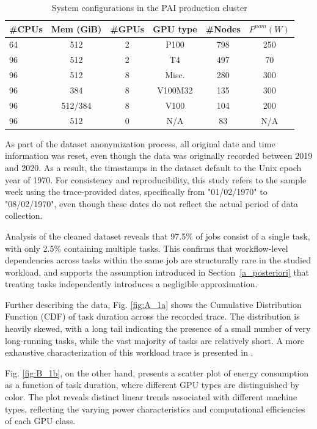 \documentclass[preprint,12pt]{elsarticle}
\begin{document}
\begin{table}[h!]
\centering
\caption{System configurations in the PAI production cluster \cite{Weng2022}}
\label{tab:specs}
\begin{tabular}{lccccc}
\toprule
\textbf{\#CPUs} & \textbf{Mem (GiB)} & \textbf{\#GPUs} & \textbf{GPU type} & \textbf{\#Nodes} & \textbf{$P^{nom} (W)$} \\
\midrule
 64  & 512       & 2 & P100        & 798 &  250 \\
 96  & 512       & 2 & T4          & 497 & 70\\
 96  & 512       & 8 & Misc.       & 280 & 300\\
 96  & 384       & 8 & V100M32 & 135  & 300\\
 96  & 512/384   & 8 & V100    & 104 & 200\\
 96  & 512       & 0 & N/A         & 83 & N/A \\
\bottomrule
\end{tabular}
\end{table}


 
As part of the dataset anonymization process, all original date and time information was reset, even though the data was originally recorded between 2019 and 2020. As a result, the timestamps in the dataset default to the Unix epoch year of 1970. For consistency and reproducibility, this study refers to the sample week using the trace-provided dates, specifically from "01/02/1970" to "08/02/1970", even though these dates do not reflect the actual period of data collection.

Analysis of the cleaned dataset reveals that 97.5\% of jobs consist of a single task, with only 2.5\% containing multiple tasks. This confirms that workflow-level dependencies across tasks within the same job are structurally rare in the studied workload, and supports the assumption introduced in Section~\ref{a_posteriori} that treating tasks independently introduces a negligible approximation.

Further describing the data, Fig. \ref{fig:A_1a} shows the Cumulative Distribution Function (CDF) of task duration across the recorded trace. The distribution is heavily skewed, with a long tail indicating the presence of a small number of very long-running tasks, while the vast majority of tasks are relatively short. A more exhaustive characterization of this workload trace is presented in \cite{Weng2022}.

Fig. \ref{fig:B_1b}, on the other hand, presents a scatter plot of energy consumption as a function of task duration, where different GPU types are distinguished by color. The plot reveals distinct linear trends associated with different machine types, reflecting the varying power characteristics and computational efficiencies of each GPU class.
\end{document}
